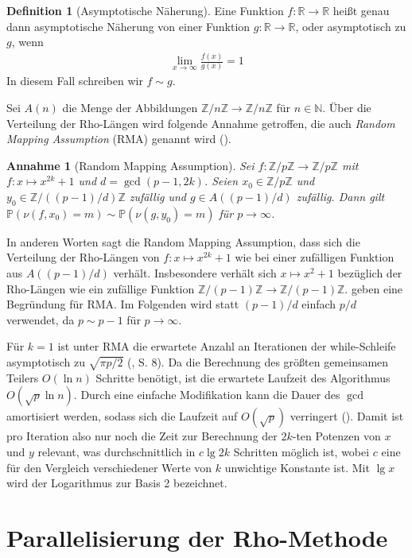 \documentclass[a4paper, 11pt, ngerman]{article}
\newcommand{\N}{\mathbb{N}}
\newcommand{\R}{\mathbb{R}}
\newcommand{\Z}{\mathbb{Z}}
\renewcommand{\P}{\mathbb{P}}
\theoremstyle{definition}
\newtheorem{definition}{Definition}
\theoremstyle{plain}
\newtheorem*{assumption*}{Annahme}
\theoremstyle{remark}
\begin{document}
\begin{definition}[Asymptotische Näherung]
    Eine Funktion $f : \R \to \R$ heißt genau dann asymptotische Näherung von einer Funktion $g : \R \to \R$, oder asymptotisch zu $g$, wenn
    \begin{align*}
        \lim_{x \to \infty} \frac {f(x)} {g(x)} = 1
    \end{align*}
    In diesem Fall schreiben wir $f \sim g$.
\end{definition}

\noindent Sei $A(n)$ die Menge der Abbildungen $\Z/n\Z \to \Z/n\Z$ für $n \in \N$. Über die Verteilung der Rho-Längen wird folgende Annahme getroffen, die auch \emph{Random Mapping Assumption} (RMA) genannt wird (\cite{bp81}).

\begin{assumption*}[Random Mapping Assumption]
    Sei $f: \Z/p\Z \to \Z/p\Z$ mit $f : x \mapsto x^{2k} + 1$ und $d = \gcd(p - 1, 2k)$. Seien $x_0 \in \Z/p\Z$ und $y_0 \in \Z/((p - 1)/d)\Z$ zufällig und $g \in A((p - 1)/d)$ zufällig. Dann gilt $\P(\nu(f, x_0) = m) \sim \P(\nu(g, y_0) = m)$ für $p \to \infty$.
\end{assumption*}

\noindent In anderen Worten sagt die Random Mapping Assumption, dass sich die Verteilung der Rho-Längen von $f : x \mapsto x^{2k} + 1$ wie bei einer zufälligen Funktion aus $A((p - 1)/d)$ verhält. Insbesondere verhält sich $x \mapsto x^2 + 1$ bezüglich der Rho-Längen wie ein zufällige Funktion $\Z/(p - 1)\Z \to \Z/(p - 1)\Z$. \cite{bp81} geben eine Begründung für RMA. Im Folgenden wird statt $(p - 1)/d$ einfach $p/d$ verwendet, da $p \sim p - 1$ für $p \to \infty$.

Für $k = 1$ ist unter RMA die erwartete Anzahl an Iterationen der while-Schleife asymptotisch zu $\sqrt{\pi p / 2}$ (\cite{knu98}, S. 8). Da die Berechnung des größten gemeinsamen Teilers $O(\ln n)$ Schritte benötigt, ist die erwartete Laufzeit des Algorithmus $O(\sqrt p \ln n)$. Durch eine einfache Modifikation kann die Dauer des $\gcd$ amortisiert werden, sodass sich die Laufzeit auf $O(\sqrt p)$ verringert (\cite{bre80}). Damit ist pro Iteration also nur noch die Zeit zur Berechnung der $2k$-ten Potenzen von $x$ und $y$ relevant, was durchschnittlich in $c \lg 2k$ Schritten möglich ist, wobei $c$ eine für den Vergleich verschiedener Werte von $k$ unwichtige Konstante ist. Mit $\lg x$ wird der Logarithmus zur Basis 2 bezeichnet.

\section{Parallelisierung der Rho-Methode}
\label{sec:rho-parallelization}
\end{document}
